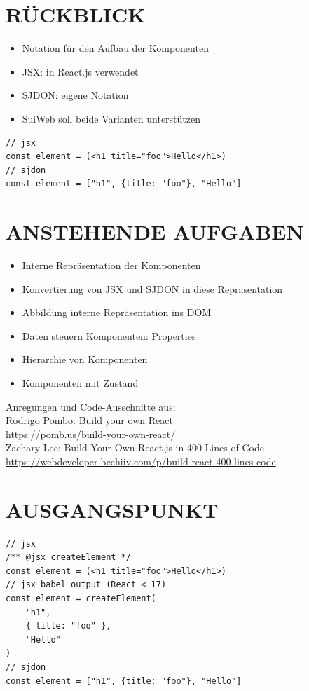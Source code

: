 \documentclass[10pt]{article}
\begin{document}
\section*{RÜCKBLICK}
\begin{itemize}
  \item Notation für den Aufbau der Komponenten
  \item JSX: in React.js verwendet
  \item SJDON: eigene Notation
  \item SuiWeb soll beide Varianten unterstützen
\end{itemize}

\begin{verbatim}
// jsx
const element = (<h1 title="foo">Hello</h1>)
// sjdon
const element = ["h1", {title: "foo"}, "Hello"]
\end{verbatim}

\section*{ANSTEHENDE AUFGABEN}
\begin{itemize}
  \item Interne Repräsentation der Komponenten
  \item Konvertierung von JSX und SJDON in diese Repräsentation
  \item Abbildung interne Repräsentation ins DOM
  \item Daten steuern Komponenten: Properties
  \item Hierarchie von Komponenten
  \item Komponenten mit Zustand
\end{itemize}

Anregungen und Code-Ausschnitte aus:\\
Rodrigo Pombo: Build your own React\\
\href{https://pomb.us/build-your-own-react/}{https://pomb.us/build-your-own-react/}\\
Zachary Lee: Build Your Own React.js in 400 Lines of Code \href{https://webdeveloper.beehiiv.com/p/build-react-400-lines-code}{https://webdeveloper.beehiiv.com/p/build-react-400-lines-code}

\section*{AUSGANGSPUNKT}
\begin{verbatim}
// jsx
/** @jsx createElement */
const element = (<h1 title="foo">Hello</h1>)
// jsx babel output (React < 17)
const element = createElement(
    "h1",
    { title: "foo" },
    "Hello"
)
// sjdon
const element = ["h1", {title: "foo"}, "Hello"]
\end{verbatim}
\end{document}
